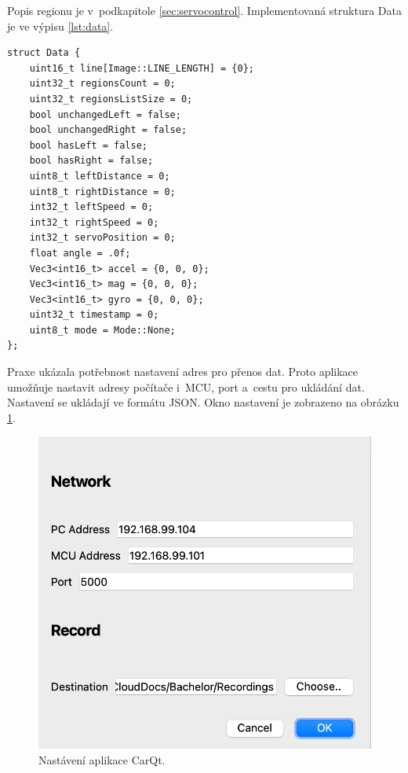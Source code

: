 Popis regionu je v~podkapitole \ref{sec:servocontrol}.
Implementovaná struktura Data je ve výpisu \ref{lst:data}.
\begin{lstlisting}[caption = Struktura Data, label = lst:data]
struct Data {
    uint16_t line[Image::LINE_LENGTH] = {0};
    uint32_t regionsCount = 0;
    uint32_t regionsListSize = 0;
    bool unchangedLeft = false;
    bool unchangedRight = false;
    bool hasLeft = false;
    bool hasRight = false;
    uint8_t leftDistance = 0;
    uint8_t rightDistance = 0;
    int32_t leftSpeed = 0;
    int32_t rightSpeed = 0;
    int32_t servoPosition = 0;
    float angle = .0f;
    Vec3<int16_t> accel = {0, 0, 0};
    Vec3<int16_t> mag = {0, 0, 0};
    Vec3<int16_t> gyro = {0, 0, 0};
    uint32_t timestamp = 0;
    uint8_t mode = Mode::None;
};
\end{lstlisting}

Praxe ukázala potřebnost nastavení adres pro přenos dat. Proto aplikace umožňuje nastavit adresy počítače i~MCU, port a~cestu pro ukládání dat. Nastavení se ukládají ve formátu JSON. Okno nastavení je zobrazeno na obrázku \ref{fig:CarQtSettings}.
\begin{figure}[!h]
\centering
    \includegraphics[width = .5\linewidth]{Figures/SettingsWindow.png}
\caption{Nastávení aplikace CarQt.}
\label{fig:CarQtSettings}
\end{figure}

\endinput